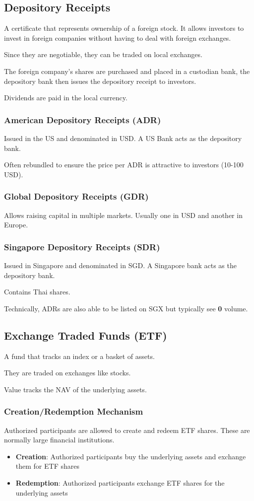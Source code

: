 \subsection{Depository Receipts}
A certificate that represents ownership of a foreign stock. It allows investors to invest in foreign companies without having to deal with foreign exchanges.

Since they are negotiable, they can be traded on local exchanges.

The foreign company's shares are purchased and placed in a custodian bank, the depository bank then issues the depository receipt to investors.

Dividends are paid in the local currency.

\subsubsection{American Depository Receipts (ADR)}
Issued in the US and denominated in USD.
A US Bank acts as the depository bank.

Often rebundled to ensure the price per ADR is attractive to investors (10-100 USD).

\subsubsection{Global Depository Receipts (GDR)}
Allows raising capital in multiple markets.
Usually one in USD and another in Europe.

\subsubsection{Singapore Depository Receipts (SDR)}
Issued in Singapore and denominated in SGD.
A Singapore bank acts as the depository bank.

Contains Thai shares.

Technically, ADRs are also able to be listed on SGX but typically see \textbf{0} volume.

\subsection{Exchange Traded Funds (ETF)}
A fund that tracks an index or a basket of assets.

They are traded on exchanges like stocks.

Value tracks the NAV of the underlying assets.

\subsubsection{Creation/Redemption Mechanism}
Authorized participants are allowed to create and redeem ETF shares. These are normally large financial institutions.
\begin{itemize}
    \item \textbf{Creation}: Authorized participants buy the underlying assets and exchange them for ETF shares
    \item \textbf{Redemption}: Authorized participants exchange ETF shares for the underlying assets
\end{itemize}

